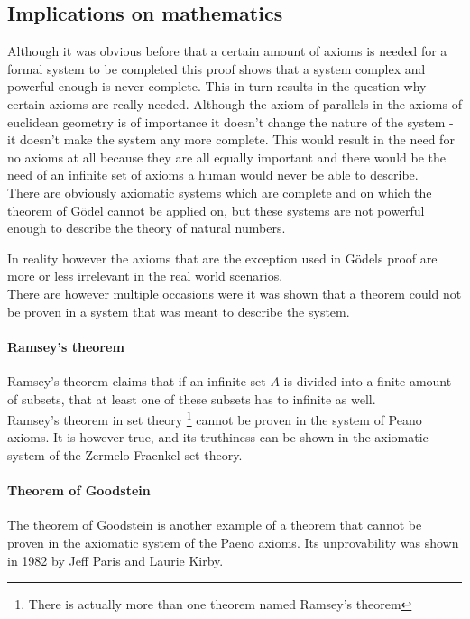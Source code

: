 \documentclass[english,12pt]{article}
\begin{document}
\subsection{Implications on mathematics}
Although it was obvious before that a certain amount of axioms is needed for a formal system to be completed this proof shows that a system complex and powerful enough is never complete. This in turn results in the question why certain axioms are really needed. Although the axiom of parallels in the axioms of euclidean geometry is of importance it doesn't change the nature of the system - it doesn't make the system any more complete. This would result in the need for no axioms at all because they are all equally important and there would be the need of an infinite set of axioms a human would never be able to describe.\\
There are obviously axiomatic systems which are complete and on which the theorem of Gödel cannot be applied on, but these systems are not powerful enough to describe the theory of natural numbers.

In reality however the axioms that are the exception used in Gödels proof are more or less irrelevant in the real world scenarios.\\
There are however multiple occasions were it was shown that a theorem could not be proven in a system that was meant to describe the system.\\
\paragraph{Ramsey's theorem}
Ramsey's theorem claims that if an infinite set $A$ is divided into a finite amount of subsets, that at least one of these subsets has to infinite as well.\\
Ramsey's theorem in set theory \footnote{There is actually more than one theorem named Ramsey's theorem} cannot be proven in  the system of Peano axioms. It is however true, and its truthiness can be shown in the axiomatic system of the Zermelo-Fraenkel-set theory.\\
\paragraph{Theorem of Goodstein}
The theorem of Goodstein is another example of a theorem that cannot be proven in the axiomatic system of the Paeno axioms. Its unprovability was shown in 1982 by Jeff Paris and Laurie Kirby.
\end{document}

